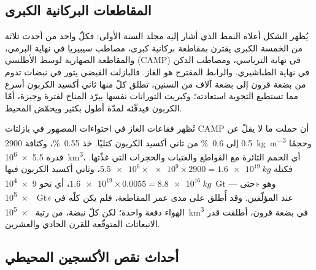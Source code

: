 
\subsection*{المقاطعات البركانية الكبرى}

يُظهر الشكل أعلاه النمط الذي أشار إليه مجلد السنة الأولى: فكلّ واحد من أحدث ثلاثة من
الخمسة الكبرى يقترن بمقاطعة بركانية كبرى، مصاطب سيبيريا في نهاية البرمي،
والمقاطعة الصهارية لوسط الأطلسي (CAMP) في نهاية الترياسي، ومصاطب الدكن في
نهاية الطباشيري. والرابط المقترح هو الغاز. فالبازلت الفيضي يثور في نبضات تدوم من بضعة
قرون إلى بضعة آلاف من السنين، تطلق كلّ منها ثاني أكسيد الكربون أسرع مما تستطيع التجوية استعادته؛
وكبريت الثورانات نفسها يبرّد المناخ لفترة وجيزة، أمّا الكربون فيدفّئه لمدّة أطول
بكثير ويحمّض المحيط.

\begin{example}\label{ex:b2:phanerozoic-earth:camp}
تُظهر فقاعات الغاز في احتواءات المصهور في بازلتات CAMP أن  حملت ما لا يقلّ عن 0.5 إلى
\qty{0.6}{\percent} من ثاني أكسيد الكربون كتليًا. خذ \qty{0.55}{\percent}، وكثافة
\qty{2900}{kg.m^{-3}} وحجمًا قدره \qty{5.5e6}{km^3}، أي الحمم الثائرة مع القواطع والعتبات
والحجرات التي غذّتها. فكتلة  $\num{5.5e6} \times \num{e9} \times 2900 =
\qty{1.6e19}{kg}$، وثاني أكسيد الكربون فيها $\num{1.6e19} \times 0.0055 = \qty{8.8e16}{kg}$، أي نحو
\qty{9e4}{Gt} --- وهو «حتى \qty{e5}{Gt}» عند المؤلّفين. وقد أُطلق على مدى عمر المقاطعة، فلم
يكن كلّه في الهواء دفعة واحدة؛ لكن كلّ نبضة، من رتبة \qty{e5}{km^3} في بضعة
قرون، أطلقت قدر الانبعاثات المتوقّعة للقرن الحادي والعشرين.
\end{example}

\subsection*{أحداث نقص الأكسجين المحيطي}

